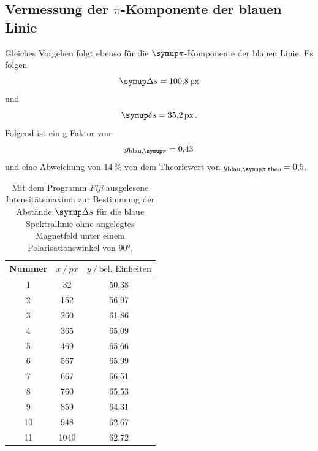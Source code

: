 \subsection{Vermessung der \texorpdfstring{$\pi$}{pi}-Komponente der blauen Linie}
Gleiches Vorgehen folgt ebenso für die $\pii$-Komponente der blauen Linie.
Es folgen
\begin{equation}
  \Deltaup s=\SI{100,8}{px}
\end{equation}
und
\begin{equation}
  \deltaup s=\SI{35,2}{px}\,.
\end{equation}
Folgend ist ein g-Faktor von
\begin{equation}
  g_{\text{blau},\pii}=0{,}43
\end{equation}
und eine Abweichung von $\SI{14}{\%}$ von dem Theoriewert von $g_{\text{blau},\pii,\text{theo}}=0{,}5$.
\begin{table}[H]
  \centering
  \caption{Mit dem Programm \textit{Fiji} \cite{Fiji} ausgelesene Intensitätsmaxima zur Bestimmung der Abstände $\Deltaup s$ für die blaue Spektrallinie ohne angelegtes Magnetfeld unter einem Polarisationswinkel von $90°$.}
  \label{tab:piblau0mT}
  \begin{tabular}{c|cc}
    \toprule
    {Nummer} & {$x \:/\: \si{px}$} & {$y \:/\: \text{bel. Einheiten}$}\\
    \midrule
 1 &  32   &	 50,38 \\
 2 &  152  &	 56,97 \\
 3 &  260  &	 61,86 \\
 4 &  365  &	 65,09 \\
 5 &  469  &	 65,66 \\
 6 &  567  &	 65,99 \\
 7 &  667  &	 66,51 \\
 8 &  760  &	 65,53\\
 9 &  859  &   64,31 \\
10 &  948  &	 62,67 \\
11 &  1040  &	 62,72 \\
  \end{tabular}
\end{table}

